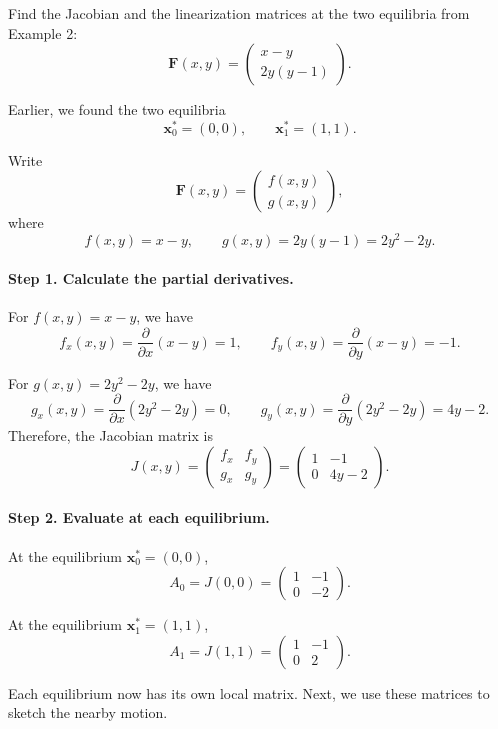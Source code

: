 \documentclass[10pt,letterpaper]{article}
\begin{document}
\begin{example}[3]{
Find the Jacobian and the linearization matrices at the two equilibria from Example 2:
\[
\mathbf{F}(x,y)
=
\begin{pmatrix}
x-y\\
2y(y-1)
\end{pmatrix}.
\]
}

Earlier, we found the two equilibria
\[
\mathbf{x}_0^*=(0,0),
\qquad
\mathbf{x}_1^*=(1,1).
\]

Write
\[
\mathbf{F}(x,y)
=
\begin{pmatrix}
f(x,y)\\
g(x,y)
\end{pmatrix},
\]
where
\[
f(x,y)=x-y,
\qquad
g(x,y)=2y(y-1)=2y^2-2y.
\]

\paragraph{Step 1. Calculate the partial derivatives.}

For $f(x,y)=x-y$, we have
\[
f_x(x,y)=\frac{\partial}{\partial x}(x-y)=1,
\qquad
f_y(x,y)=\frac{\partial}{\partial y}(x-y)=-1.
\]

For $g(x,y)=2y^2-2y$, we have
\[
g_x(x,y)=\frac{\partial}{\partial x}(2y^2-2y)=0,
\qquad
g_y(x,y)=\frac{\partial}{\partial y}(2y^2-2y)=4y-2.
\]
Therefore, the Jacobian matrix is
\[
J(x,y)
=
\begin{pmatrix}
f_x & f_y\\
g_x & g_y
\end{pmatrix}
=
\begin{pmatrix}
1 & -1\\
0 & 4y-2
\end{pmatrix}.
\]

\paragraph{Step 2. Evaluate at each equilibrium.}

At the equilibrium $\mathbf{x}_0^*=(0,0)$,
\[
A_0
=
J(0,0)
=
\begin{pmatrix}
1 & -1\\
0 & -2
\end{pmatrix}.
\]

At the equilibrium $\mathbf{x}_1^*=(1,1)$,
\[
A_1
=
J(1,1)
=
\begin{pmatrix}
1 & -1\\
0 & 2
\end{pmatrix}.
\]


Each equilibrium now has its own local matrix. Next, we use these matrices to sketch the nearby motion.
\end{example}
\end{document}
